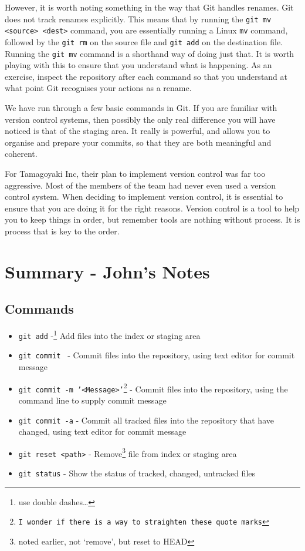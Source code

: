However, it is worth noting something in the way that Git handles renames.
Git does not track renames explicitly.
This means that by running the \texttt{git mv <source> <dest>} command, you are essentially running a Linux \texttt{mv} command, followed by the \texttt{git rm} on the source file and \texttt{git add} on the destination file.
Running the \texttt{git mv} command is a shorthand way of doing just that.
It is worth playing with this to ensure that you understand what is happening.
As an exercise, inspect the repository after each command so that you understand at what point Git recognises your actions as a rename.

We have run through a few basic commands in Git.
If you are familiar with version control systems, then possibly the only real difference you will have noticed is that of the staging area.
It really is powerful, and allows you to organise and prepare your commits, so that they are both meaningful and coherent.

For Tamagoyaki Inc, their plan to implement version control was far too aggressive.
Most of the members of the team had never even used a version control system.
When deciding to implement version control, it is essential to ensure that you are doing it for the right reasons.
Version control is a tool to help you to keep things in order, but remember tools are nothing without process.
It is process that is key to the order.


\clearpage
\section{Summary - John's Notes}
\subsection{Commands}
\begin{itemize}
\item\texttt{git add} -\footnote{use double dashes\ldots} Add files into the index or staging area

\item\texttt{git commit } - Commit files into the repository, using text editor for commit message

\item\texttt{git commit -m '<Message>'\footnote{I wonder if there is a way to straighten these quote marks}} - Commit files into the repository, using the command line to supply commit message

\item\texttt{git commit -a} - Commit all tracked files into the repository that have changed, using text editor for commit message

\item\texttt{git reset <path>} - Remove\footnote{noted earlier, not `remove', but reset to HEAD} file from index or staging area

\item\texttt{git status} - Show the status of tracked, changed, untracked files
\end{itemize}


